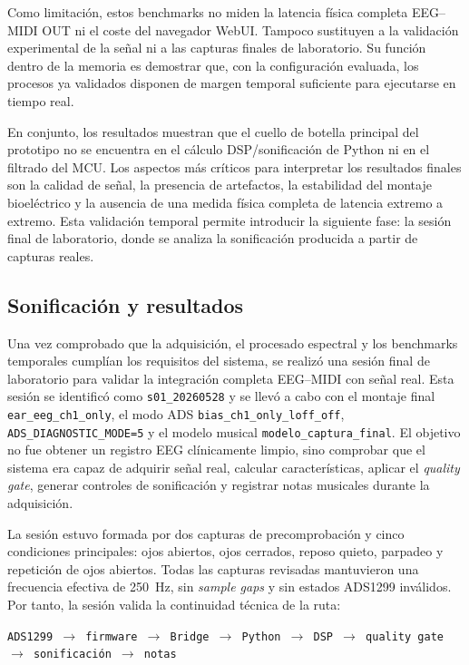 \documentclass[../main.tex]{subfiles}
\begin{document}
Como limitación, estos benchmarks no miden la latencia física completa EEG--MIDI OUT ni el coste del navegador WebUI. Tampoco sustituyen a la validación experimental de la señal ni a las capturas finales de laboratorio. Su función dentro de la memoria es demostrar que, con la configuración evaluada, los procesos ya validados disponen de margen temporal suficiente para ejecutarse en tiempo real.

En conjunto, los resultados muestran que el cuello de botella principal del prototipo no se encuentra en el cálculo DSP/sonificación de Python ni en el filtrado del MCU. Los aspectos más críticos para interpretar los resultados finales son la calidad de señal, la presencia de artefactos, la estabilidad del montaje bioeléctrico y la ausencia de una medida física completa de latencia extremo a extremo. Esta validación temporal permite introducir la siguiente fase: la sesión final de laboratorio, donde se analiza la sonificación producida a partir de capturas reales.


\subsection{Sonificación y resultados}
\label{subsec:validacion_sonificacion_resultados}

Una vez comprobado que la adquisición, el procesado espectral y los benchmarks temporales cumplían los requisitos del sistema, se realizó una sesión final de laboratorio para validar la integración completa EEG--MIDI con señal real. Esta sesión se identificó como \texttt{s01\_20260528} y se llevó a cabo con el montaje final \texttt{ear\_eeg\_ch1\_only}, el modo ADS \texttt{bias\_ch1\_only\_loff\_off}, \texttt{ADS\_DIAGNOSTIC\_MODE=5} y el modelo musical \texttt{modelo\_captura\_final}. El objetivo no fue obtener un registro EEG clínicamente limpio, sino comprobar que el sistema era capaz de adquirir señal real, calcular características, aplicar el \textit{quality gate}, generar controles de sonificación y registrar notas musicales durante la adquisición.

La sesión estuvo formada por dos capturas de precomprobación y cinco condiciones principales: ojos abiertos, ojos cerrados, reposo quieto, parpadeo y repetición de ojos abiertos. Todas las capturas revisadas mantuvieron una frecuencia efectiva de \SI{250}{\hertz}, sin \textit{sample gaps} y sin estados ADS1299 inválidos. Por tanto, la sesión valida la continuidad técnica de la ruta:

\begin{center}
\texttt{ADS1299 $\rightarrow$ firmware $\rightarrow$ Bridge $\rightarrow$ Python $\rightarrow$ DSP $\rightarrow$ quality gate $\rightarrow$ sonificación $\rightarrow$ notas}
\end{center}
\end{document}
